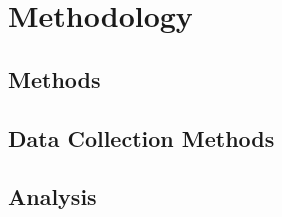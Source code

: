 \chapter{Methodology} \label{chap:Methodology}

\section{Methods}

\section{Data Collection Methods}

\section{Analysis}